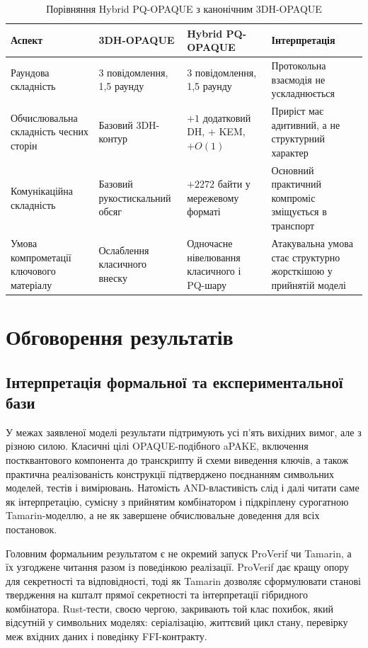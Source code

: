 \documentclass{llncs}
\begin{document}
\begin{table}[htbp]
\caption{Порівняння Hybrid PQ-OPAQUE з канонічним 3DH-OPAQUE}
\label{tab:baseline-comparison}
\centering\scriptsize
\begin{tabularx}{\textwidth}{@{}L{3.3cm}L{2.9cm}L{3.1cm}X@{}}
\toprule
Аспект & 3DH-OPAQUE & Hybrid PQ-OPAQUE & Інтерпретація \\
\midrule
Раундова складність & 3 повідомлення, 1{,}5 раунду & 3 повідомлення, 1{,}5 раунду & Протокольна взаємодія не ускладнюється \\
Обчислювальна складність чесних сторін & Базовий 3DH-контур & $+1$ додатковий DH, $+$ KEM, $+O(1)$ & Приріст має адитивний, а не структурний характер \\
Комунікаційна складність & Базовий рукостискальний обсяг & $+2272$ байти у мережевому форматі & Основний практичний компроміс зміщується в транспорт \\
Умова компрометації ключового матеріалу & Ослаблення класичного внеску & Одночасне нівелювання класичного і PQ-шару & Атакувальна умова стає структурно жорсткішою у прийнятій моделі \\
\bottomrule
\end{tabularx}
\end{table}

\section{Обговорення результатів}

\subsection{Інтерпретація формальної та експериментальної бази}

У межах заявленої моделі результати підтримують усі п'ять вихідних
вимог, але з різною силою. Класичні цілі OPAQUE-подібного aPAKE,
включення постквантового компонента до транскрипту й схеми виведення
ключів, а також практична реалізованість конструкції підтверджено
поєднанням символьних моделей, тестів і вимірювань. Натомість
AND-властивість слід і далі читати саме як інтерпретацію, сумісну з
прийнятим комбінатором і підкріплену сурогатною Tamarin-моделлю, а не
як завершене обчислювальне доведення для всіх постановок.

Головним формальним результатом є не окремий запуск ProVerif чи
Tamarin, а їх узгоджене читання разом із поведінкою реалізації. ProVerif
дає кращу опору для секретності та відповідності, тоді як Tamarin
дозволяє сформулювати станові твердження на кшталт прямої секретності
та інтерпретації гібридного комбінатора. Rust-тести, своєю чергою,
закривають той клас похибок, який відсутній у символьних моделях:
серіалізацію, життєвий цикл стану, перевірку меж вхідних даних і
поведінку FFI-контракту.
\end{document}
